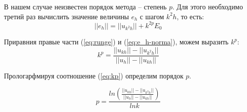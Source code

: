В нашем случае неизвестен порядок метода -- степень $p$. Для этого необходимо третий раз вычислить значение величины $e_h$ с шагом $k^2h$, то есть:
\begin{equation}
     ||e_h|| = ||u_{k^2h}|| + k^{2p}E_0
    \label{eq:e_h-norma}
\end{equation}

Приравния правые части (\ref{eq:runge}) и (\ref{eq:e_h-norma}), можем выразить $k^p$:
\begin{equation}
    k^p = \frac{||u_{kh}|| - ||u_{k^2h}||}{||u_{h}|| - ||u_{kh}||}
    \label{eq:kp}
\end{equation} 

Прологарфмируя соотношение (\ref{eq:kp}) определим порядок $p$.

\begin{equation}
    p =\frac{ ln \left(\frac{||u_{kh}|| - ||u_{k^2h}||}{||u_{h}|| - ||u_{kh}||}\right)}{ln k}
    \label{eq:mke-level}
\end{equation}
